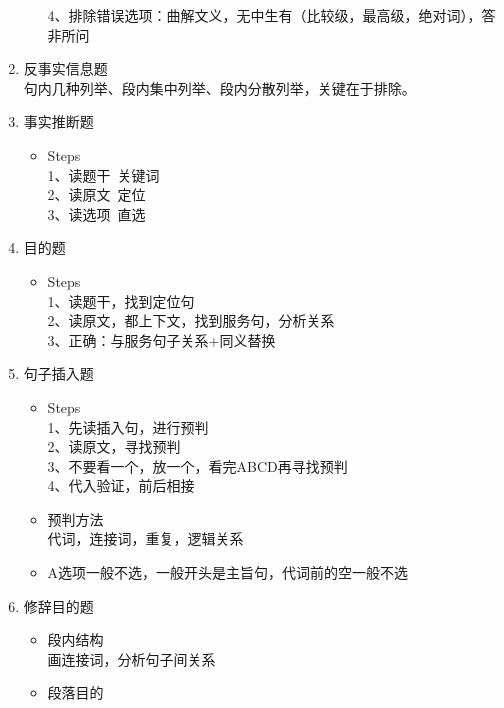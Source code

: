 \documentclass[UTF8]{ctexart}
\begin{document}
\begin{enumerate}[A]
\begin{itemize}
    4、排除错误选项：曲解文义，无中生有（比较级，最高级，绝对词），答非所问\\
  \end{itemize}
  \item 反事实信息题\\
  句内几种列举、段内集中列举、段内分散列举，关键在于排除。
  \item 事实推断题\\
  \begin{itemize}
    \item Steps\\
    1、读题干~关键词\\
    2、读原文~定位\\
    3、读选项~直选\\
  \end{itemize}
  \item 目的题\\
  \begin{itemize}
   \item Steps\\
    1、读题干，找到定位句\\
    2、读原文，都上下文，找到服务句，分析关系\\
    3、正确：与服务句子关系+同义替换\\
  \end{itemize}
  \item 句子插入题\\
  \begin{itemize}
  \item Steps\\
    1、先读插入句，进行预判\\
    2、读原文，寻找预判\\
    3、不要看一个，放一个，看完ABCD再寻找预判\\
    4、代入验证，前后相接\\
    \item 预判方法\\
    代词，连接词，重复，逻辑关系\\
    \item A选项一般不选，一般开头是主旨句，代词前的空一般不选\\
  \end{itemize}
  \item 修辞目的题\\
  \begin{itemize}
    \item 段内结构\\
    画连接词，分析句子间关系
    \item 段落目的\\

\end{itemize}
\end{enumerate}
\end{document}
